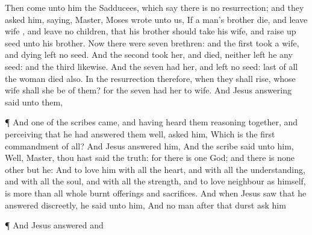 {Then
come
unto
him the
Sadducees,
which
say there
is
no
resurrection;
and they
asked
him,
saying,
Master,
Moses
wrote unto
us,
If a
man’s
brother
die,
and
leave
{}
wife
{},
and
leave
no
children,
that
his
brother should
take
his
wife,
and raise
up
seed unto
his
brother.
Now there
were
seven
brethren:
and the
first
took a
wife,
and
dying
left
no
seed.
And the
second
took
her,
and
died,
neither
left
he any
seed:
and the
third
likewise.
And the
seven
had
her,
and
left
no
seed:
last of
all the
woman
died
also.
In the
resurrection
therefore,
when they shall
rise,
whose
wife shall she
be of
them?
for the
seven
had
her to
wife.
And
Jesus
answering
said unto
them,
{}
\par }{\PP {}¶
And
one of the
scribes
came, and having
heard
them reasoning
together, and
perceiving
that he had
answered
them
well,
asked
him,
Which
is the
first
commandment of
all?
And
Jesus
answered
him,
{}
And the
scribe
said unto
him,
Well,
Master, thou hast
said the
truth:
for there
is
one
God;
and there
is
none
other
but
he:
And to
love
him
with
all the
heart,
and
with
all the
understanding,
and
with
all the
soul,
and
with
all the
strength,
and to
love
{}
neighbour
as
himself,
is
more than
all whole burnt
offerings
and
sacrifices.
And when
Jesus
saw
that he
answered
discreetly, he
said unto
him,
{}
And no
man after
that
durst
ask
him
{}
\par }{\PP {}¶
And
Jesus
answered and
}
